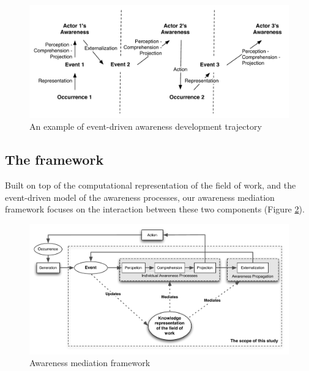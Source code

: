 \begin{figure}[htbp] %
   \centering
   \includegraphics[width=4.5in]{example_awareness_traj.pdf} 
   \caption{An example of event-driven awareness development trajectory}
   \label{fig:example_awareness_traj}
\end{figure}

\subsection{The framework} %
\label{sub:the_awareness_mediation_framework}
Built on top of the computational representation of the field of work, and the event-driven model of the awareness processes, our awareness mediation framework focuses on the interaction between these two components (Figure \ref{fig:awareness_mediation_framework}). 

\begin{figure}[htbp] %
   \centering
   \includegraphics[width=5.5in]{awareness_mediation_framework.pdf} 
   \caption{Awareness mediation framework}
   \label{fig:awareness_mediation_framework}
\end{figure}

